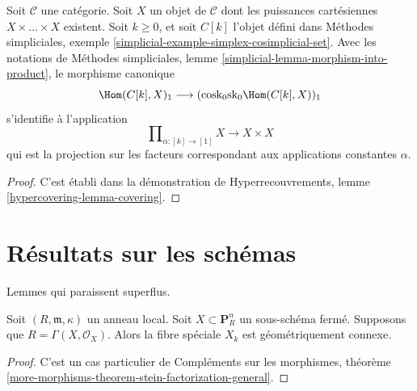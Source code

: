 \begin{lemma}
\label{lemma-cosk0-hom-deltak}
Soit $\mathcal{C}$ une catégorie. Soit $X$ un objet de $\mathcal{C}$
dont les puissances cartésiennes $X \times \ldots \times X$ existent.
Soit $k \geq 0$, et soit $C[k]$ l'objet défini dans
Méthodes simpliciales, exemple \ref{simplicial-example-simplex-cosimplicial-set}.
Avec les notations de
Méthodes simpliciales, lemme \ref{simplicial-lemma-morphism-into-product},
le morphisme canonique
$$
\Hom(C[k], X)_1
\longrightarrow
(\text{cosk}_0 \text{sk}_0 \Hom(C[k], X))_1
$$
s'identifie à l'application
$$
\prod\nolimits_{\alpha : [k] \to [1]} X
\longrightarrow
X \times X
$$
qui est la projection sur les facteurs correspondant aux applications
constantes $\alpha$.
\end{lemma}

\begin{proof}
C'est établi dans la démonstration de
Hyperrecouvrements, lemme \ref{hypercovering-lemma-covering}.
\end{proof}



\section{Résultats sur les schémas}
\label{section-devissage}

\noindent
Lemmes qui paraissent superflus.

\begin{lemma}
\label{lemma-stein-projective}
Soit $(R, \mathfrak m, \kappa)$ un anneau local.
Soit $X \subset \mathbf{P}^n_R$ un sous-schéma fermé.
Supposons que $R = \Gamma(X, \mathcal{O}_X)$. Alors la fibre spéciale
$X_k$ est géométriquement connexe.
\end{lemma}

\begin{proof}
C'est un cas particulier de
Compléments sur les morphismes, théorème
\ref{more-morphisms-theorem-stein-factorization-general}.
\end{proof}

